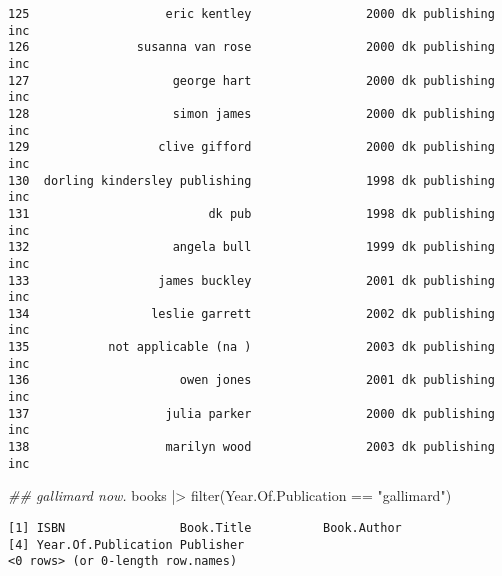 \documentclass[
]{report}
\newenvironment{Shaded}{\begin{snugshade}}{\end{snugshade}}
\newcommand{\DocumentationTok}[1]{\textcolor[rgb]{0.37,0.37,0.37}{\textit{#1}}}
\newcommand{\FunctionTok}[1]{\textcolor[rgb]{0.28,0.35,0.67}{#1}}
\newcommand{\NormalTok}[1]{\textcolor[rgb]{0.00,0.23,0.31}{#1}}
\newcommand{\OtherTok}[1]{\textcolor[rgb]{0.00,0.23,0.31}{#1}}
\newcommand{\SpecialCharTok}[1]{\textcolor[rgb]{0.37,0.37,0.37}{#1}}
\newcommand{\StringTok}[1]{\textcolor[rgb]{0.13,0.47,0.30}{#1}}
\begin{document}
\begin{verbatim}
125                   eric kentley                2000 dk publishing inc
126               susanna van rose                2000 dk publishing inc
127                    george hart                2000 dk publishing inc
128                    simon james                2000 dk publishing inc
129                  clive gifford                2000 dk publishing inc
130  dorling kindersley publishing                1998 dk publishing inc
131                         dk pub                1998 dk publishing inc
132                    angela bull                1999 dk publishing inc
133                  james buckley                2001 dk publishing inc
134                 leslie garrett                2002 dk publishing inc
135           not applicable (na )                2003 dk publishing inc
136                     owen jones                2001 dk publishing inc
137                   julia parker                2000 dk publishing inc
138                   marilyn wood                2003 dk publishing inc
\end{verbatim}

\begin{Shaded}
\begin{Highlighting}[]
\DocumentationTok{\#\# gallimard now. }
\NormalTok{books }\SpecialCharTok{|\textgreater{}} \FunctionTok{filter}\NormalTok{(Year.Of.Publication }\SpecialCharTok{==} \StringTok{"gallimard"}\NormalTok{)}
\end{Highlighting}
\end{Shaded}

\begin{verbatim}
[1] ISBN                Book.Title          Book.Author        
[4] Year.Of.Publication Publisher          
<0 rows> (or 0-length row.names)
\end{verbatim}

\begin{Shaded}
\end{Shaded}
\end{document}

